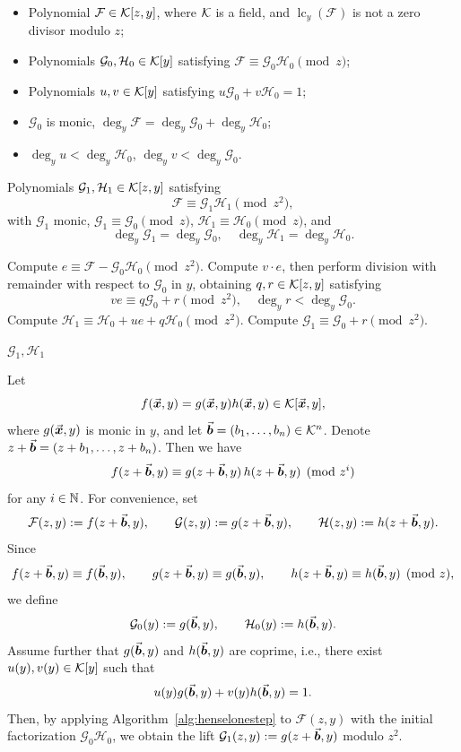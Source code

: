 \documentclass{article}
\numberwithin{equation}{section}
\begin{document}
\begin{algorithm}
\caption{One-Step Hensel Lifting}
\label{alg:henselonestep}
\begin{algorithmic}[1]
\Require
    \begin{itemize}
        \item Polynomial $\mathcal{F} \in {\mathcal{K}}[z,y]$, where ${\mathcal{K}}$ is a field, and $\operatorname{lc}_y(\mathcal{F})$ is not a zero divisor modulo $z$;
        \item Polynomials $\mathcal{G}_0,\mathcal{H}_0\in {\mathcal{K}}[y]$ satisfying $\mathcal{F} \equiv \mathcal{G}_0 \mathcal{H}_0 \pmod z$;
        \item Polynomials $u, v \in {\mathcal{K}}[y]$ satisfying $u \mathcal{G}_0 + v \mathcal{H}_0 = 1$;
        \item $\mathcal{G}_0$ is monic, $\deg_y \mathcal{F} = \deg_y \mathcal{G}_0 + \deg_y \mathcal{H}_0$;
        \item $\deg_y u < \deg_y \mathcal{H}_0$, $\deg_y v < \deg_y \mathcal{G}_0$.
    \end{itemize}
\Ensure
    Polynomials $\mathcal{G}_1, \mathcal{H}_1 \in {\mathcal{K}}[z,y]$ satisfying
    \[
    \mathcal{F} \equiv \mathcal{G}_1 \mathcal{H}_1 \pmod{z^2},
    \]
    with $\mathcal{G}_1$ monic, $\mathcal{G}_1 \equiv \mathcal{G}_0 \pmod{z}$, $\mathcal{H}_1 \equiv \mathcal{H}_0 \pmod{z}$, and
    \[
    \deg_y \mathcal{G}_1 = \deg_y \mathcal{G}_0,\quad \deg_y \mathcal{H}_1 = \deg_y \mathcal{H}_0.
    \]

\State Compute $e \equiv \mathcal{F} - \mathcal{G}_0 \mathcal{H}_0 \pmod{z^2}$.
\State Compute $v \cdot e$, then perform division with remainder with respect to $\mathcal{G}_0$ in $y$, obtaining $q, r \in {\mathcal{K}}[z,y]$ satisfying
\[
v e \equiv q \mathcal{G}_0 + r \pmod{z^2},\quad \deg_y r < \deg_y \mathcal{G}_0.
\]
\State Compute $\mathcal{H}_1 \equiv \mathcal{H}_0 + u e + q \mathcal{H}_0 \pmod{z^2}$.
\State Compute $\mathcal{G}_1 \equiv \mathcal{G}_0 + r \pmod{z^2}$.

\State \Return $\mathcal{G}_1, \mathcal{H}_1$
\end{algorithmic}
\end{algorithm}


Let $$f(\vec{\boldsymbol{x}},y)=g(\vec{\boldsymbol{x}},y)h(\vec{\boldsymbol{x}},y)\in {\mathcal{K}}[\vec{\boldsymbol{x}},y],$$ where $g(\vec{\boldsymbol{x}},y)$ is monic in $y$, and let $\vec{\boldsymbol{b}}=(b_1,\dots,b_n)\in {\mathcal{K}}^n$. Denote $z+\vec{\boldsymbol{b}}=(z+b_1,\dots,z+b_n)$. Then we have
\[
f(z+\vec{\boldsymbol{b}}, y) \equiv g(z+\vec{\boldsymbol{b}}, y)\, h(z+\vec{\boldsymbol{b}}, y) \pmod{z^i}
\]
for any $i\in {\mathbb N}$. For convenience, set
\[
\mathcal{F}(z,y):=f(z+\vec{\boldsymbol{b}}, y),\qquad
\mathcal{G}(z,y):=g(z+\vec{\boldsymbol{b}}, y),\qquad
\mathcal{H}(z,y):=h(z+\vec{\boldsymbol{b}}, y).
\]
Since
\[
f(z+\vec{\boldsymbol{b}}, y)\equiv f(\vec{\boldsymbol{b}},y),\qquad
g(z+\vec{\boldsymbol{b}}, y)\equiv g(\vec{\boldsymbol{b}},y),\qquad
h(z+\vec{\boldsymbol{b}}, y)\equiv h(\vec{\boldsymbol{b}},y) \pmod{z},
\]
we define
\[
\mathcal{G}_0(y):=g(\vec{\boldsymbol{b}},y),\qquad \mathcal{H}_0(y):=h(\vec{\boldsymbol{b}},y).
\]
Assume further that $g(\vec{\boldsymbol{b}},y)$ and $h(\vec{\boldsymbol{b}},y)$ are coprime, i.e., there exist $u(y),v(y)\in{\mathcal{K}}[y]$ such that
\[
u(y)g(\vec{\boldsymbol{b}},y)+v(y)h(\vec{\boldsymbol{b}},y)=1.
\]
Then, by applying Algorithm~\ref{alg:henselonestep} to $\mathcal{F}(z,y)$ with the initial factorization $\mathcal{G}_0\mathcal{H}_0$, we obtain the lift $\mathcal{G}_1(z,y):=g(z+\vec{\boldsymbol{b}},y)$ modulo $z^2$.
\end{document}
